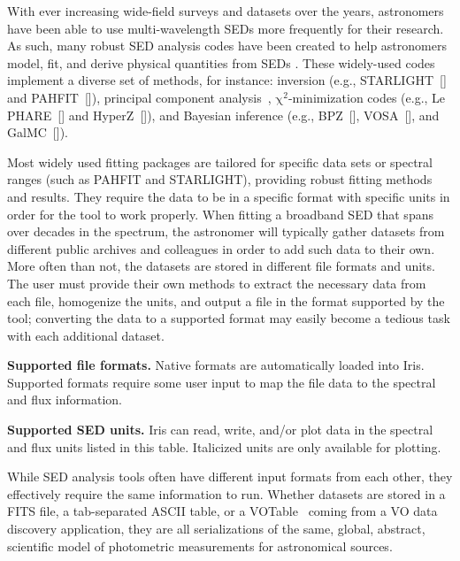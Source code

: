 \documentclass[preprint,authoryear,5p]{elsarticle}
\begin{document}
With ever increasing wide-field surveys and datasets over the years,
astronomers have been able to use multi-wavelength SEDs more frequently for
their research. As such, many robust SED analysis codes have been created to
help astronomers mod\-el, fit, and derive physical quantities from SEDs
\citep{2011Ap&SS.331....1W,2013ARA&A..51..393C}. These widely-used codes
implement a diverse set of methods, for instance: inversion (e.g., 
STARLIGHT~[\citealp{2004MNRAS.355..273C}] and
PAHFIT~[\citealp{2007ApJ...656..770S}]),
principal component analysis~\citep[e.g.,][]{2009MNRAS.394.1496B},
$\mathrm{\chi}^{2}$-minimization codes 
(e.g., Le PHARE~[\citealp{1999MNRAS.310..540A,2006A&A...457..841I}] and 
HyperZ~[\citealp{2000A&A...363..476B}]), and Bayesian inference 
(e.g., BPZ~[\citealp{2000ApJ...536..571B}], 
VOSA~[\citealp{2008A&A...492..277B}], and 
GalMC~[\citealp{2011ApJ...737...47A}]).

Most widely used fitting packages are tailored for specific data sets or
spectral ranges (such as PAHFIT and STAR\-LIGHT), providing robust
fitting methods and results. They require the data to be in a specific format
with specific units in order for the tool to work properly. When fitting a
broadband SED that spans over decades in the spectrum, the astronomer will
typically gather datasets from different public archives and colleagues in order
to add such data to their own. More often than not, the datasets are stored in
different file formats and units. 
The user must provide their own methods to extract the necessary data from each
file, homogenize the units, and output a file in the format supported by the
tool; converting the data to a supported format may easily become a tedious task
with each additional dataset.

\begin{table}[tp!]
\caption{\textbf{Supported file formats.} Native formats are automatically loaded into
Iris. Supported formats require some user input to map the file data to the spectral
and flux information.}
\label{table:file_formats}

\end{table}

\begin{table}[h!]
\caption{\textbf{Supported SED units.} Iris can read, write, and/or plot data in
the spectral and flux units listed in this table. Italicized units are only available
for plotting.}
\label{table:units}

\end{table}

While SED analysis tools often have different input formats from each other,
they effectively require the same information to run. Whether datasets are
stored in a FITS file, a tab-separated ASCII table, or a 
VOTable~\citep{2011arXiv1110.0524O} coming from a
VO data discovery application, they are all serializations of the same, global,
abstract, scientific model of photometric measurements for
astronomical sources.
\end{document}
